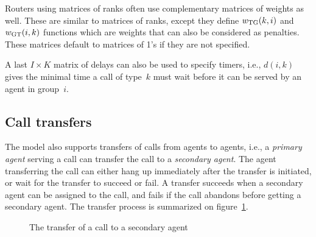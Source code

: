 
\begin{comment}
By default, no automatic conversion is performed between any of these
structures.
If information is missing for constructing the router, the simulator
reports an error.
However, one can explicitly specifies some transformations, e.g.,
to generate the type-to-group matrix of ranks by transposing the
group-to-type matrix of ranks.
See the type \texttt{Router\-Params} in namespace
\path{http://www.iro.umontreal.ca/lecuyer/contactcenters/msk},
from the HTML documentation in \path{doc/schemas} for
more information about this.
\end{comment}

Routers using matrices of ranks often use complementary matrices
of weights
as well.  These are similar to matrices of ranks, except they define
$w_{\mathrm{TG}}(k, i)$ and $w_{\mathrm{GT}}(i, k)$ functions which are weights that can
also be considered as penalties.
These matrices default to matrices of 1's if they are not specified.

A last $I\times K$ matrix of delays can also be used to specify
timers, i.e., $d(i, k)$ gives the minimal time a call of type~$k$ must
wait before it can be served by an agent in group~$i$.

\subsection{Call transfers}

The model also supports transfers of calls from agents to agents, i.e.,
a \emph{primary agent} serving a call can transfer the call to
a \emph{secondary agent}.
The agent transferring the call can either hang up immediately after
the transfer is initiated, or wait for the transfer to succeed or fail.
A transfer succeeds when a secondary agent can be assigned to the
call, and fails if the call abandons before getting a secondary agent.
The transfer process is summarized on figure~\ref{fig:calltransfer}.

\begin{figure}
\centering

\caption{The transfer of a call to a secondary agent}
\label{fig:calltransfer}
\end{figure}

